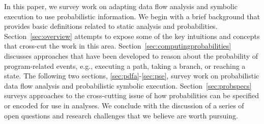 In this paper, we survey work on adapting data flow analysis 
and symbolic execution to use probabilistic information.
We begin with a brief background that provides basic definitions
related to static analysis and probabilities.
Section~\ref{sec:overview} attempts to expose some of the key
intuitions and concepts that cross-cut the work in this area.
Section~\ref{sec:computingprobabilities} discusses approaches that
have been developed to reason about the probability of program-related 
events, e.g., executing a path, taking a branch, or reaching a state.
The following two sections, \ref{sec:pdfa}-\ref{sec:pse}, 
survey work on probabilistic data flow analysis and probabilistic
symbolic execution.  
Section~\ref{sec:probspecs} surveys approaches to the cross-cutting
issue of how probabilities can be specified or encoded for use
in analyses.
We conclude with the discussion of a series of open questions
and research challenges that we believe are worth pursuing.


